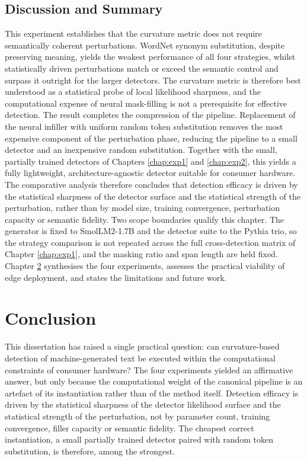 \documentclass[logo,msc,cs]{infthesis}      %
\begin{document}
\section{Discussion and Summary}
\label{sec:exp4_summary}
This experiment establishes that the curvature metric does not require semantically coherent perturbations. WordNet synonym substitution, despite preserving meaning, yields the weakest performance of all four strategies, whilst statistically driven perturbations match or exceed the semantic control and surpass it outright for the larger detectors. The curvature metric is therefore best understood as a statistical probe of local likelihood sharpness, and the computational expense of neural mask-filling is not a prerequisite for effective detection.
The result completes the compression of the pipeline. Replacement of the neural infiller with uniform random token substitution removes the most expensive component of the perturbation phase, reducing the pipeline to a small detector and an inexpensive random substitution. Together with the small, partially trained detectors of Chapters \ref{chap:exp1} and \ref{chap:exp2}, this yields a fully lightweight, architecture-agnostic detector suitable for consumer hardware. The comparative analysis therefore concludes that detection efficacy is driven by the statistical sharpness of the detector surface and the statistical strength of the perturbation, rather than by model size, training convergence, perturbation capacity or semantic fidelity.
Two scope boundaries qualify this chapter. The generator is fixed to SmolLM2-1.7B and the detector suite to the Pythia trio, so the strategy comparison is not repeated across the full cross-detection matrix of Chapter \ref{chap:exp1}, and the masking ratio and span length are held fixed. Chapter \ref{chap:conclusion} synthesises the four experiments, assesses the practical viability of edge deployment, and states the limitations and future work.

\chapter{Conclusion}
\label{chap:conclusion}
This dissertation has raised a single practical question: can curvature-based detection of machine-generated text be executed within the computational constraints of consumer hardware? The four experiments yielded an affirmative answer, but only because the computational weight of the canonical pipeline is an artefact of its instantiation rather than of the method itself. Detection efficacy is driven by the statistical sharpness of the detector likelihood surface and the statistical strength of the perturbation, not by parameter count, training convergence, filler capacity or semantic fidelity. The cheapest correct instantiation, a small partially trained detector paired with random token substitution, is therefore, among the strongest.
\end{document}
